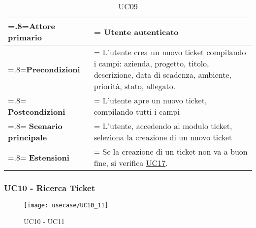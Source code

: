  \begin{table}[H]
                \centering
                \renewcommand{\arraystretch}{1.8}
                \renewcommand\tabularxcolumn[1]{m{#1}}
                \begin{tabularx}{0.9\textwidth} {
                    >{\hsize=.8\hsize\linewidth=\hsize}X
                    >{\hsize=1.2\hsize\linewidth=\hsize}X}
                    \hline
                    \textbf{Attore primario} & Utente autenticato \\
                    \hline
                    \textbf{Precondizioni} & L'utente crea un nuovo ticket compilando i campi: azienda, progetto, titolo, descrizione, data di scadenza, ambiente, priorità, stato, allegato. \\
                    \hline
                    \textbf{Postcondizioni} & L'utente apre un nuovo ticket, compilando tutti i campi \\
                    \hline
                    \textbf{Scenario principale} & L'utente, accedendo al modulo ticket, seleziona la creazione di un nuovo ticket \\
                    \hline
                    \textbf{Estensioni} & Se la creazione di un ticket non va a buon fine, si verifica \hyperref[UC17]{UC17}. \\

                    \hline
                \end{tabularx}
                \caption{UC09}
\end{table}

\subsubsection{UC10 - Ricerca Ticket}

\begin{figure}[H]
    \centering 
    \texttt{[image: usecase/UC10\_11]}
    \caption{UC10 - UC11}
\end{figure}
 
